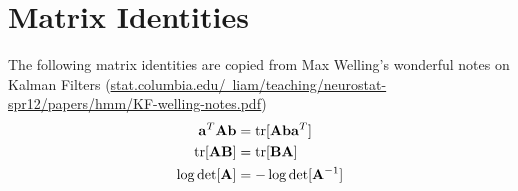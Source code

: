 \documentclass[12pt]{article}
\begin{document}
\section{Matrix Identities} \label{sec:matrix_identities}
The following matrix identities are copied from Max Welling's wonderful notes on Kalman Filters (\href{http://www.stat.columbia.edu/~liam/teaching/neurostat-spr12/papers/hmm/KF-welling-notes.pdf}{stat.columbia.edu/~liam/teaching/neurostat-spr12/papers/hmm/KF-welling-notes.pdf})
\begin{align}
    \mathbf{a}^T \mathbf{A} \mathbf{b} &= \operatorname{tr} [\mathbf{A} \mathbf{b} \mathbf{a}^T] \\
    \operatorname{tr} [\mathbf{A} \mathbf{B}] &= \operatorname{tr} [\mathbf{B} \mathbf{A}] \\
    \log \det [\mathbf{A}] &= - \log \det [\mathbf{A}^{-1}]
\end{align}
\end{document}
